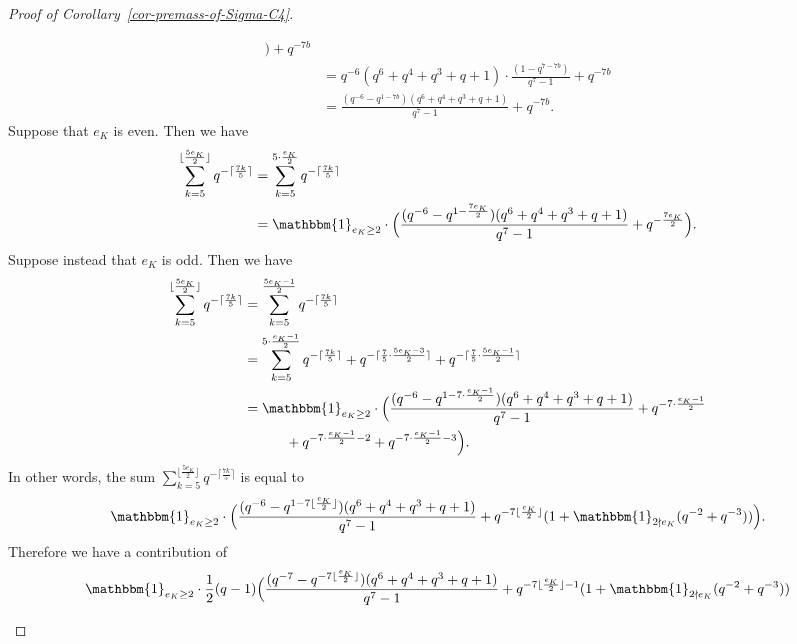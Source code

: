 \documentclass[11pt]{amsart}
\theoremstyle{theorem}
\theoremstyle{example}
\theoremstyle{definition}
\numberwithin{theorem}{section}
\numberwithin{theorem}{section}
\begin{document}
\begin{proof}[Proof of Corollary~\ref{cor-premass-of-Sigma-C4}]
\begin{enumerate}
\begin{enumerate}
\begin{align*}
            \Big) + q^{-7b}
            \\
            &= q^{-6}(q^6 + q^4 + q^3 + q + 1) \cdot \frac{(1 - q^{7-7b})}{q^7-1} + q^{-7b}
            \\
            &= \frac{(q^{-6} - q^{1-7b})(q^6 + q^4 + q^3 + q + 1)}{q^7-1} + q^{-7b}.
            \end{align*}
            Suppose that $e_K$ is even. Then we have 
            \begin{align*}
                \sum_{k=5}^{\lfloor \frac{5e_K}{2}\rfloor} q^{- \lceil \frac{7k}{5}\rceil} &= \sum_{k=5}^{5\cdot\frac{e_K}{2}} q^{-\lceil\frac{7k}{5}\rceil} 
                \\
                &= \mathbbm{1}_{e_K\geq 2}\cdot \Big(\frac{(q^{-6} - q^{1-\frac{7e_K}{2}})(q^6 + q^4 + q^3 + q + 1)}{q^7-1} + q^{-\frac{7e_K}{2}}\Big).
            \end{align*}
            Suppose instead that $e_K$ is odd. Then we have 
                \begin{align*}
                    \sum_{k=5}^{\lfloor \frac{5e_K}{2}\rfloor} q^{- \lceil \frac{7k}{5}\rceil} &=  \sum_{k=5}^{\frac{5e_K - 1}{2}} q^{- \lceil \frac{7k}{5}\rceil}
                    \\
                    &= \sum_{k=5}^{5\cdot\frac{e_K-1}{2}}q^{-\lceil \frac{7k}{5}\rceil} + q^{-\lceil\frac{7}{5}\cdot \frac{5e_K - 3}{2}\rceil} + q^{-\lceil\frac{7}{5}\cdot \frac{5e_K-1}{2}\rceil}
                    \\
                    &= \mathbbm{1}_{e_K \geq 2}\cdot \Big(\frac{(q^{-6} - q^{1 - 7\cdot\frac{e_K - 1}{2}})(q^6 + q^4 + q^3 + q + 1)}{q^7-1} + q^{-7\cdot \frac{e_K-1}{2}} 
                    \\
                    &\quad \quad\quad + q^{-7\cdot \frac{e_K-1}{2} - 2} + q^{-7\cdot\frac{e_K-1}{2} - 3}\Big).
                \end{align*}
            In other words, the sum $\sum_{k=5}^{\lfloor \frac{5e_K}{2}\rfloor} q^{- \lceil \frac{7k}{5}\rceil}$ is equal to 
            $$
            \mathbbm{1}_{e_K \geq 2}\cdot\Big( \frac{(q^{-6} - q^{1 - 7\lfloor\frac{e_K}{2}\rfloor})(q^6 + q^4 + q^3 + q + 1)}{q^7 - 1} + q^{-7\lfloor\frac{e_K}{2}\rfloor}(1 + \mathbbm{1}_{2\nmid e_K}(q^{-2} + q^{-3}))\Big).
            $$
            Therefore we have a contribution of 
            $$
            \mathbbm{1}_{e_K\geq 2}\cdot \frac{1}{2}(q-1)\Big(
                \frac{(q^{-7} - q^{ - 7\lfloor\frac{e_K}{2}\rfloor})(q^6 + q^4 + q^3 + q + 1)}{q^7 - 1} + q^{-7\lfloor\frac{e_K}{2}\rfloor-1}(1 + \mathbbm{1}_{2\nmid e_K}(q^{-2} + q^{-3}))
$$
\end{enumerate}
\end{enumerate}
\end{proof}
\end{document}
